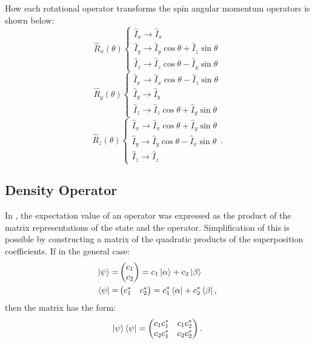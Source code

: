 How each rotational operator transforms the spin angular momentum operators is shown
below:
\begin{equation}
  \hat{R}_x(\theta) \begin{cases}
    \hat{I}_x \rightarrow \hat{I}_x \\
    \hat{I}_y \rightarrow \hat{I}_y\cos\theta + \hat{I}_z\sin\theta \\
    \hat{I}_z \rightarrow \hat{I}_z\cos\theta - \hat{I}_y\sin\theta
\end{cases}
\end{equation}
\begin{equation}
  \hat{R}_y(\theta) \begin{cases}
    \hat{I}_x \rightarrow \hat{I}_x\cos\theta - \hat{I}_z\sin\theta \\
    \hat{I}_y \rightarrow \hat{I}_y \\
    \hat{I}_z \rightarrow \hat{I}_z\cos\theta + \hat{I}_y\sin\theta
\end{cases}
\end{equation}
\begin{equation}
  \hat{R}_z(\theta) \begin{cases}
    \hat{I}_x \rightarrow \hat{I}_x\cos\theta + \hat{I}_y\sin\theta \\
    \hat{I}_y \rightarrow \hat{I}_y\cos\theta - \hat{I}_x\sin\theta \\
    \hat{I}_z \rightarrow \hat{I}_z
\end{cases}.
\end{equation}


\subsection{Density Operator}\label{Density}

In , the expectation value of an operator was expressed as
the product of the matrix representations of the state and the operator. Simplification of this
is possible by constructing a matrix of the quadratic products of the superposition coefficients. If in the
general case:
\begin{align}
\ket{\psi} =& \begin{pmatrix}
    c_1\\
    c_2
\end{pmatrix} = c_1\ket{\alpha} + c_2\ket{\beta}\\
\bra{\psi} =& \begin{pmatrix}
  c_1^* & c_2^*
\end{pmatrix} = c_1^*\bra{\alpha} + c_2^*\bra{\beta},
\end{align}
then the matrix has the form:
\begin{equation}
\ket{\psi}\bra{\psi} = \begin{pmatrix}
    {c_1c_1^*} & {c_1c_2^*}\\
    {c_2c_1^*} & {c_2c_2^*}
\end{pmatrix}.
\end{equation}

